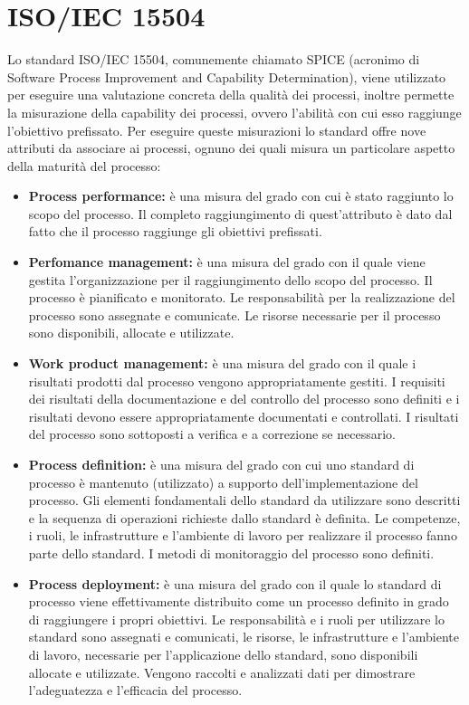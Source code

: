 \section{ISO/IEC 15504}
Lo standard ISO/IEC 15504, comunemente chiamato SPICE (acronimo di Software Process Improvement and Capability Determination), viene utilizzato per eseguire una valutazione concreta della qualità dei processi, inoltre permette la misurazione della capability dei processi, ovvero l'abilità con cui esso raggiunge l'obiettivo prefissato. Per eseguire queste misurazioni lo standard offre nove attributi da associare ai processi, ognuno dei quali misura un particolare aspetto della maturità del processo:
\begin{itemize}
	\item \textbf{Process performance:} è una misura del grado con cui è stato raggiunto lo scopo del processo. Il completo raggiungimento di quest'attributo è dato dal fatto che il processo raggiunge gli obiettivi prefissati.
	\item \textbf{Perfomance management:} è una misura del grado con il quale viene gestita l'organizzazione per il raggiungimento dello scopo del processo. Il processo è pianificato e monitorato. Le responsabilità per la realizzazione del processo sono assegnate e comunicate. Le risorse necessarie per il processo sono disponibili, allocate e utilizzate. 
	\item \textbf{Work product management:} è una misura del grado con il quale i risultati prodotti dal processo vengono appropriatamente gestiti. I requisiti dei risultati della documentazione e del controllo del processo sono definiti e i risultati devono essere appropriatamente documentati e controllati. I risultati del processo sono sottoposti a verifica e a correzione se necessario.
	\item \textbf{Process definition:} è una misura del grado con cui uno standard di processo è mantenuto (utilizzato) a supporto dell'implementazione del processo. Gli elementi fondamentali dello standard da utilizzare sono descritti e la sequenza di operazioni richieste dallo standard è definita. Le competenze, i ruoli, le infrastrutture e l'ambiente di lavoro per realizzare il processo fanno parte dello standard. I metodi di monitoraggio del processo sono definiti.
	\item \textbf{Process deployment:} è una misura del grado con il quale lo standard di processo viene effettivamente distribuito come un processo definito in grado di raggiungere i propri obiettivi. Le responsabilità e i ruoli per utilizzare lo standard sono assegnati e comunicati, le risorse, le infrastrutture e l'ambiente di lavoro, necessarie per l'applicazione dello standard, sono disponibili allocate e utilizzate. Vengono raccolti e analizzati dati per dimostrare l'adeguatezza e l'efficacia del processo.

\end{itemize}
